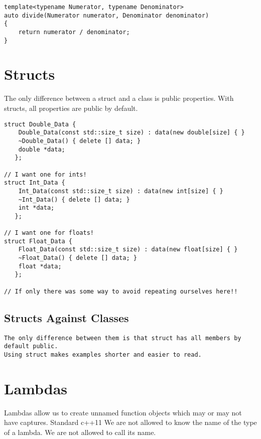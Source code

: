 \begin{verbatim}
template<typename Numerator, typename Denominator>
auto divide(Numerator numerator, Denominator denominator)
{
    return numerator / denominator;
}
\end{verbatim}


\section{Structs}

The only difference between a struct and a class is public properties. With
structs, all properties are public by default.

\begin{verbatim}
struct Double_Data {
    Double_Data(const std::size_t size) : data(new double[size] { }
    ~Double_Data() { delete [] data; }
    double *data;
   };

// I want one for ints!
struct Int_Data {
    Int_Data(const std::size_t size) : data(new int[size] { }
    ~Int_Data() { delete [] data; }
    int *data;
   };

// I want one for floats!
struct Float_Data {
    Float_Data(const std::size_t size) : data(new float[size] { }
    ~Float_Data() { delete [] data; }
    float *data;
   };

// If only there was some way to avoid repeating ourselves here!!
\end{verbatim}

\subsection{Structs Against Classes}
\begin{verbatim}
The only difference between them is that struct has all members by default public.
Using struct makes examples shorter and easier to read. 
\end{verbatim}

\section{Lambdas}

Lambdas allow us to create unnamed function objects which may or may not have captures.
Standard c++11
We are not allowed to know the name of the type of a lambda. We are not allowed to call its name.

